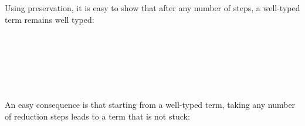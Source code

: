 Using preservation, it is easy to show that after any number of steps, a
well-typed term remains well typed:

\begin{fence}
\begin{code}%
\>[0]\<%
\\
\>[0][@{}l@{\AgdaIndent{0}}]%
\>[2]\AgdaSpace{}%
\AgdaSymbol{:}\AgdaSpace{}%
\AgdaSpace{}%
\AgdaSymbol{\{}\AgdaSpace{}%
\AgdaSpace{}%
\AgdaSymbol{\}}\<%
\\
\>[2][@{}l@{\AgdaIndent{0}}]%
\>[4]\AgdaSpace{}%
\AgdaSpace{}%
\AgdaSpace{}%
\AgdaSpace{}%
\AgdaSpace{}%
\<%
\\
%
\>[4]%
\>[2316I]\AgdaSpace{}%
\AgdaSpace{}%
\<%
\\
\>[.][@{}l@{}]\<[2316I]%
\>[6]\AgdaComment{---------}\<%
\\
%
\>[4]\AgdaSpace{}%
\AgdaSpace{}%
\AgdaSpace{}%
\AgdaSpace{}%
\AgdaSpace{}%
\<%
\end{code}
\end{fence}

An easy consequence is that starting from a well-typed term, taking any
number of reduction steps leads to a term that is not stuck:

\begin{fence}
\begin{code}%
\>[0]\<%
\\
\>[0][@{}l@{\AgdaIndent{0}}]%
\>[2]\AgdaSpace{}%
\AgdaSymbol{:}\AgdaSpace{}%
\AgdaSpace{}%
\AgdaSymbol{\{}\AgdaSpace{}%
\AgdaSpace{}%
\AgdaSymbol{\}}\<%
\\
\>[2][@{}l@{\AgdaIndent{0}}]%
\>[4]\AgdaSpace{}%
\AgdaSpace{}%
\AgdaSpace{}%
\AgdaSpace{}%
\AgdaSpace{}%
\<%
\\
%
\>[4]%
\>[2334I]\AgdaSpace{}%
\AgdaSpace{}%
\<%
\\
\>[.][@{}l@{}]\<[2334I]%
\>[6]\AgdaComment{-----------}\<%
\\
%
\>[4]\AgdaSpace{}%
\AgdaSpace{}%
\AgdaSymbol{(}\AgdaSpace{}%
\AgdaSymbol{)}\<%
\end{code}
\end{fence}

